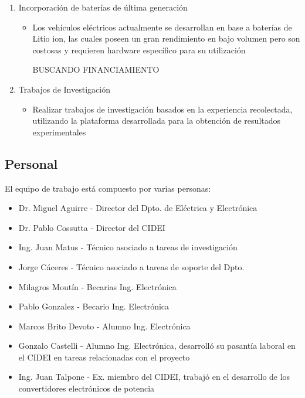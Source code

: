 \documentclass[a4paper]{article}
\begin{document}
\begin{enumerate}
    \item Incorporación de baterías de última generación
    \begin{itemize}
        \item Los vehículos eléctricos actualmente se desarrollan en base a baterías de Litio ion, las cuales poseen un gran rendimiento en bajo volumen pero son costosas y requieren hardware específico para su utilización \par BUSCANDO FINANCIAMIENTO
    \end{itemize}    
    \item Trabajos de Investigación
    \begin{itemize}
        \item Realizar trabajos de investigación basados en la experiencia recolectada, utilizando la plataforma desarrollada para la obtención de resultados experimentales
    \end{itemize}    
\end{enumerate}

\subsection{Personal}
El equipo de trabajo está compuesto por varias personas:
\begin{itemize}
    \item Dr. Miguel Aguirre - Director del Dpto. de Eléctrica y Electrónica
    \item Dr. Pablo Cossutta - Director del CIDEI
    \item Ing. Juan Matus - Técnico asociado a tareas de investigación
    \item Jorge Cáceres - Técnico asociado a tareas de soporte del Dpto.
    \item Milagros Moutín - Becarias Ing. Electrónica
    \item Pablo Gonzalez - Becario Ing. Electrónica
    \item Marcos Brito Devoto - Alumno Ing. Electrónica
    \item Gonzalo Castelli - Alumno Ing. Electrónica, desarrolló su pasantía laboral en el CIDEI en tareas relacionadas con el proyecto
    \item Ing. Juan Talpone - Ex. miembro del CIDEI, trabajó en el desarrollo de los convertidores electrónicos de potencia
\end{itemize}
\end{document}

